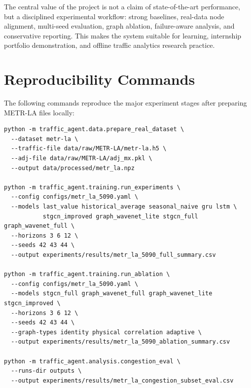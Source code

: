 \documentclass[11pt]{article}
\begin{document}
The central value of the project is not a claim of state-of-the-art performance, but a disciplined experimental workflow: strong baselines, real-data node alignment, multi-seed evaluation, graph ablation, failure-aware analysis, and conservative reporting. This makes the system suitable for learning, internship portfolio demonstration, and offline traffic analytics research practice.

\appendix
\section{Reproducibility Commands}
The following commands reproduce the major experiment stages after preparing METR-LA files locally:
\begin{verbatim}
python -m traffic_agent.data.prepare_real_dataset \
  --dataset metr-la \
  --traffic-file data/raw/METR-LA/metr-la.h5 \
  --adj-file data/raw/METR-LA/adj_mx.pkl \
  --output data/processed/metr_la.npz

python -m traffic_agent.training.run_experiments \
  --config configs/metr_la_5090.yaml \
  --models last_value historical_average seasonal_naive gru lstm \
           stgcn_improved graph_wavenet_lite stgcn_full graph_wavenet_full \
  --horizons 3 6 12 \
  --seeds 42 43 44 \
  --output experiments/results/metr_la_5090_full_summary.csv

python -m traffic_agent.training.run_ablation \
  --config configs/metr_la_5090.yaml \
  --models stgcn_full graph_wavenet_full graph_wavenet_lite stgcn_improved \
  --horizons 3 6 12 \
  --seeds 42 43 44 \
  --graph-types identity physical correlation adaptive \
  --output experiments/results/metr_la_5090_ablation_summary.csv

python -m traffic_agent.analysis.congestion_eval \
  --runs-dir outputs \
  --output experiments/results/metr_la_congestion_subset_eval.csv
\end{verbatim}
\end{document}
